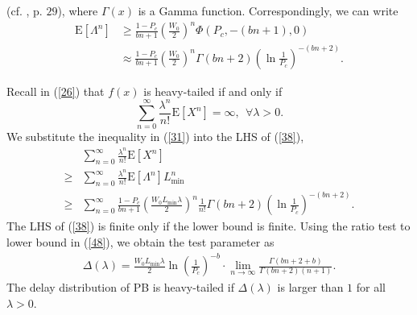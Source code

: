 \documentclass[journal]{IEEEtran}
\begin{document}
(cf. \cite{1953:Bateman}, p. $29$), where $\Gamma(x)$ is a Gamma function. Correspondingly, we can write
\begin{equation}
\label{31}
\begin{aligned}
\text{E}\left[\Lambda^n\right]&\geq \frac{1-P_c}{bn+1}\left(\frac{W_0}{2}\right)^n\Phi \left(P_c, -(bn+1), 0\right)\\
&\approx\frac{1-P_c}{bn+1}\left(\frac{W_0}{2}\right)^n\Gamma(bn+2) \left(\ln\frac{1}{P_c}\right)^{-\left(bn+2\right)}.
\end{aligned}
\end{equation}

Recall in (\ref{26}) that $f(x)$ is heavy-tailed if and only if
\begin{equation}
\label{38}
\sum_{n=0}^{\infty} \frac{\lambda^n}{n!}\text{E}\left[X^n\right]=\infty,\ \ \forall \lambda>0.
\end{equation}
We substitute the inequality in (\ref{31}) into the LHS of (\ref{38}),
\begin{equation}
\label{48}
\begin{aligned}
&\sum_{n=0}^{\infty} \frac{\lambda^n}{n!}\text{E}\left[X^n\right] \\
\geq&  \sum_{n=0}^{\infty} \frac{\lambda^n}{n!} \text{E}\left[\Lambda^n\right]L_{\text{min}}^n \\
\geq&  \sum_{n=0}^{\infty} \frac{1-P_c}{bn+1}\left(\frac{W_0L_{\text{min}}\lambda}{2}\right)^n\frac{1}{n!} \Gamma(bn+2) \left(\ln\frac{1}{P_c}\right)^{-\left(bn+2\right)}.
\end{aligned}
\end{equation}
The LHS of (\ref{38}) is finite only if the lower bound is finite. Using the ratio test to lower bound in (\ref{48}), we obtain the test parameter as
\begin{equation}
\label{30}
\begin{aligned}
\Delta(\lambda) = \frac{W_0L_{\text{min}}\lambda}{2}\ln\left(\frac{1}{P_c}\right)^{-b} \cdot \lim_{n\rightarrow \infty} \frac{\Gamma(bn+2+b)}{\Gamma(bn+2)(n+1)}.
\end{aligned}
\end{equation}
The delay distribution of PB is heavy-tailed if $\Delta(\lambda)$ is larger than $1$ for all $\lambda>0$.
\end{document}
